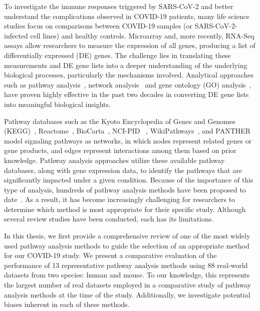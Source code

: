 \documentclass[Minh_PhD_thesis.tex]{subfiles}
\begin{document}
To investigate the immune responses triggered by SARS-CoV-2 and better understand the complications observed in COVID-19 patients, many life science studies focus on comparisons between COVID-19 samples (or SARS-CoV-2-infected cell lines) and healthy controls. Microarray and, more recently, RNA-Seq assays allow researchers to measure the expression of all genes, producing a list of differentially expressed (DE) genes. The challenge lies in translating these measurements and DE gene lists into a deeper understanding of the underlying biological processes, particularly the mechanisms involved. Analytical approaches such as pathway analysis~\cite{ihnatova2018critical, DraghiciOntologicalToolsReview:2005, Khatri:2012, mitrea2013methods,  nguyen2018network, nguyen2019identifying, tarca2013comparison}, network analysis~\cite{mitra2013integrative} and gene ontology (GO) analysis~\cite{DraghiciOntologicalToolsReview:2005,Rhee:2008}, have proven highly effective in the past two decades in converting DE gene lists into meaningful biological insights.

Pathway databases such as the Kyoto Encyclopedia of Genes and Genomes (KEGG)~\cite{Kanehisa:2000}, Reactome~\cite{croft2014reactome}, BioCarta~\cite{BioCartaWWW}, NCI-PID ~\cite{Schaefer:2009}, WikiPathways~\cite{pico2008wikipathways}, and PANTHER~\cite{thomas2003panther} model signaling pathways as networks, in which nodes represent related genes or gene products, and edges represent interactions among them based on prior knowledge. 
Pathway analysis approaches utilize these available pathway databases, along with gene expression data, to identify the pathways that are significantly impacted under a given condition. 
Because of the importance of this type of analysis, hundreds of pathway analysis methods have been proposed to date~\cite{DraghiciOntologicalToolsReview:2005,Khatri:2002,mitrea2013methods}.
As a result, it has become increasingly challenging for researchers to determine which method is most appropriate for their specific study. 
Although several review studies have been conducted, each has its limitations.

In this thesis, we first provide a comprehensive review of one of the most widely used pathway analysis methods to guide the selection of an appropriate method for our COVID-19 study. 
We present a comparative evaluation of the performance of 13 representative pathway analysis methods using 88 real-world datasets from two species: human and mouse. To our knowledge, this represents the largest number of real datasets employed in a comparative study of pathway analysis methods at the time of the study. Additionally, we investigate potential biases inherent in each of these methods.
\end{document}
